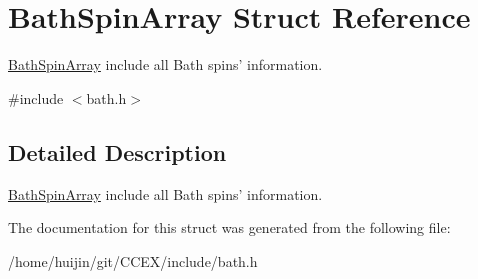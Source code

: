 \hypertarget{structBathSpinArray}{\section{Bath\-Spin\-Array Struct Reference}
\label{structBathSpinArray}
}


\hyperlink{structBathSpinArray}{Bath\-Spin\-Array} include all Bath spins' information.  




{\ttfamily \#include $<$bath.\-h$>$}



\subsection{Detailed Description}
\hyperlink{structBathSpinArray}{Bath\-Spin\-Array} include all Bath spins' information. 

The documentation for this struct was generated from the following file\-:\begin{DoxyCompactItemize}
\item 
/home/huijin/git/\-C\-C\-E\-X/include/bath.\-h\end{DoxyCompactItemize}
